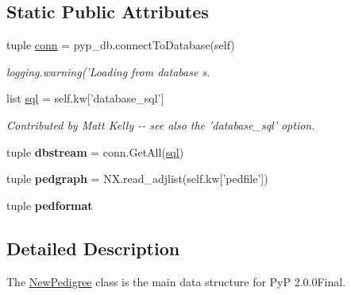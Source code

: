 \subsection*{Static Public Attributes}
\begin{DoxyCompactItemize}
\item 
tuple \hyperlink{classPyPedal_1_1pyp__newclasses_1_1NewPedigree_a76f7cf65bd46330008eeb3305e77c980}{conn} = pyp\_\-db.connectToDatabase(self)
\begin{DoxyCompactList}\small\item\em logging.warning('Loading from database s. \end{DoxyCompactList}\item 
\hypertarget{classPyPedal_1_1pyp__newclasses_1_1NewPedigree_a61f54404c46a5760e36cc23ad40c6fc0}{
list \hyperlink{classPyPedal_1_1pyp__newclasses_1_1NewPedigree_a61f54404c46a5760e36cc23ad40c6fc0}{sql} = self.kw\mbox{[}'database\_\-sql'\mbox{]}}
\label{classPyPedal_1_1pyp__newclasses_1_1NewPedigree_a61f54404c46a5760e36cc23ad40c6fc0}

\begin{DoxyCompactList}\small\item\em Contributed by Matt Kelly -\/-\/ see also the 'database\_\-sql' option. \end{DoxyCompactList}\item 
\hypertarget{classPyPedal_1_1pyp__newclasses_1_1NewPedigree_a8963625966b725b83d5a2a38615babf1}{
tuple {\bfseries dbstream} = conn.GetAll(\hyperlink{classPyPedal_1_1pyp__newclasses_1_1NewPedigree_a61f54404c46a5760e36cc23ad40c6fc0}{sql})}
\label{classPyPedal_1_1pyp__newclasses_1_1NewPedigree_a8963625966b725b83d5a2a38615babf1}

\item 
\hypertarget{classPyPedal_1_1pyp__newclasses_1_1NewPedigree_ad288876c207f905a1b67eb8a57a59e9d}{
tuple {\bfseries pedgraph} = NX.read\_\-adjlist(self.kw\mbox{[}'pedfile'\mbox{]})}
\label{classPyPedal_1_1pyp__newclasses_1_1NewPedigree_ad288876c207f905a1b67eb8a57a59e9d}

\item 
tuple {\bfseries pedformat}
\end{DoxyCompactItemize}


\subsection{Detailed Description}
The \hyperlink{classPyPedal_1_1pyp__newclasses_1_1NewPedigree}{NewPedigree} class is the main data structure for PyP 2.0.0Final. 



